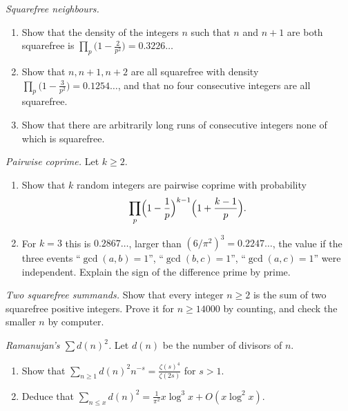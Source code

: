 \begin{exercise}[$\star\star$]\label{pb:consecsqfree}
\emph{Squarefree neighbours.}
\begin{enumerate}[label=(\alph*)]
\item Show that the density of the integers $n$ such that $n$ and $n+1$ are both squarefree is
$\prod_p\bigl(1-\frac2{p^2}\bigr)=0.3226\ldots$
\item Show that $n,n+1,n+2$ are all squarefree with density $\prod_p\bigl(1-\frac3{p^2}\bigr)=0.1254\ldots$, and that no four
consecutive integers are all squarefree.
\item Show that there are arbitrarily long runs of consecutive integers none of which is squarefree.
\end{enumerate}
\end{exercise}

\begin{exercise}[$\star\star$]\label{pb:pairwise}
\emph{Pairwise coprime.} Let $k\ge2$.
\begin{enumerate}[label=(\alph*)]
\item Show that $k$ random integers are pairwise coprime with probability
\[
\prod_p\Bigl(1-\frac1p\Bigr)^{k-1}\Bigl(1+\frac{k-1}p\Bigr).
\]
\item For $k=3$ this is $0.2867\ldots$, larger than $(6/\pi^2)^3=0.2247\ldots$, the value if the three events
``$\gcd(a,b)=1$'', ``$\gcd(b,c)=1$'', ``$\gcd(a,c)=1$'' were independent. Explain the sign of the difference prime by prime.
\end{enumerate}
\end{exercise}

\begin{exercise}[$\star\star\star$]\label{pb:twosqfree}
\emph{Two squarefree summands.} Show that every integer $n\ge2$ is the sum of two squarefree positive integers. Prove it for
$n\ge14000$ by counting, and check the smaller $n$ by computer.
\end{exercise}

\begin{exercise}[$\star\star$]\label{pb:dsquared}
\emph{Ramanujan's $\sum d(n)^2$.} Let $d(n)$ be the number of divisors of $n$.
\begin{enumerate}[label=(\alph*)]
\item Show that $\sum_{n\ge1}d(n)^2n^{-s}=\frac{\zeta(s)^4}{\zeta(2s)}$ for $s>1$.
\item Deduce that $\sum_{n\le x}d(n)^2=\frac1{\pi^2}x\log^3x+O(x\log^2x)$.
\end{enumerate}
\end{exercise}

